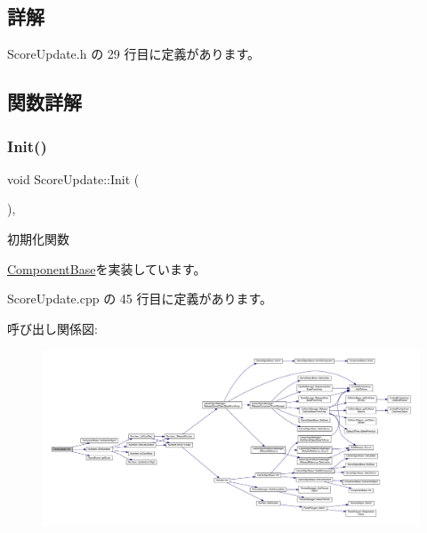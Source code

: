\subsection{詳解}


 Score\+Update.\+h の 29 行目に定義があります。



\subsection{関数詳解}
\mbox{\label{class_score_update_afd51e11ad00ebc15d9b3139398437afc}} 
\subsubsection{\texorpdfstring{Init()}{Init()}}
{\footnotesize\ttfamily void Score\+Update\+::\+Init (\begin{DoxyParamCaption}{ }\end{DoxyParamCaption})\hspace{0.3cm}{\ttfamily [override]}, {\ttfamily [virtual]}}



初期化関数 



\mbox{\hyperlink{class_component_base_a125939d6befe42f28886a6523e86b18b}{Component\+Base}}を実装しています。



 Score\+Update.\+cpp の 45 行目に定義があります。

呼び出し関係図\+:
\nopagebreak
\begin{figure}[H]
\begin{center}
\leavevmode
\includegraphics[width=350pt]{class_score_update_afd51e11ad00ebc15d9b3139398437afc_cgraph}
\end{center}
\end{figure}
\mbox{\label{class_score_update_adc9a48f54828e49c072c298777935893}} 
